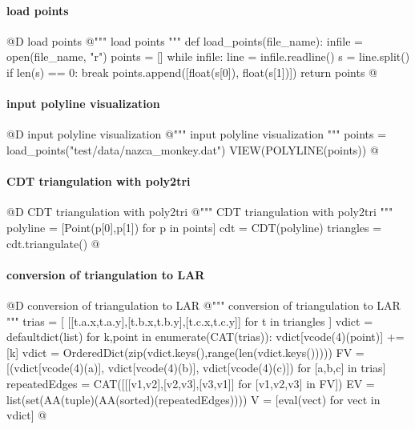 \documentclass[11pt,oneside]{article}    %
\begin{document}
\paragraph{load points}
@D load points
@{""" load points """
def load_points(file_name):
    infile = open(file_name, "r")
    points = []
    while infile:
        line = infile.readline()
        s = line.split()
        if len(s) == 0:
            break
        points.append([float(s[0]), float(s[1])])
    return points
@}


\paragraph{input polyline visualization}
@D input polyline visualization
@{""" input polyline visualization """
points = load_points("test/data/nazca_monkey.dat")
VIEW(POLYLINE(points))
@}

\paragraph{CDT triangulation with poly2tri}
@D CDT triangulation with poly2tri
@{""" CDT triangulation with poly2tri """
polyline = [Point(p[0],p[1]) for p in points]  
cdt = CDT(polyline)
triangles = cdt.triangulate()
@}
  
\paragraph{conversion of triangulation to LAR}
@D conversion of triangulation to LAR
@{""" conversion of triangulation to LAR """
trias = [ [[t.a.x,t.a.y],[t.b.x,t.b.y],[t.c.x,t.c.y]] for t in triangles ]
vdict = defaultdict(list)
for k,point in enumerate(CAT(trias)): 
    vdict[vcode(4)(point)] += [k]
vdict = OrderedDict(zip(vdict.keys(),range(len(vdict.keys()))))
FV = [(vdict[vcode(4)(a)], vdict[vcode(4)(b)], vdict[vcode(4)(c)]) for [a,b,c] in trias] 
repeatedEdges = CAT([[[v1,v2],[v2,v3],[v3,v1]] for [v1,v2,v3] in FV])
EV = list(set(AA(tuple)(AA(sorted)(repeatedEdges))))
V = [eval(vect) for vect in vdict]
@}
\end{document}
